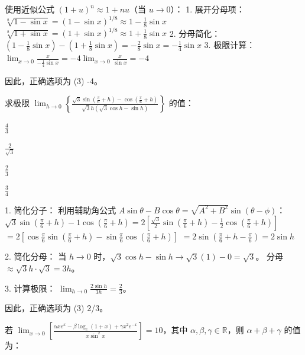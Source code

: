 \begin{questions}
\begin{solution}
使用近似公式 $(1+u)^n \approx 1+nu$（当 $u \to 0$）：
1. 展开分母项：
   $\sqrt[8]{1-\sin x} = (1-\sin x)^{1/8} \approx 1 - \frac{1}{8}\sin x$
   $\sqrt[8]{1+\sin x} = (1+\sin x)^{1/8} \approx 1 + \frac{1}{8}\sin x$
2. 分母简化：
   $(1 - \frac{1}{8}\sin x) - (1 + \frac{1}{8}\sin x) = -\frac{2}{8}\sin x = -\frac{1}{4}\sin x$
3. 极限计算：
   $\lim_{x \to 0} \frac{x}{-\frac{1}{4}\sin x} = -4 \lim_{x \to 0} \frac{x}{\sin x} = -4$

因此，正确选项为 (3) -4。
\end{solution}

\question 
求极限 $\lim_{h \to 0} \left\{ \frac{\sqrt{3}\sin(\frac{\pi}{6}+h) - \cos(\frac{\pi}{6}+h)}{\sqrt{3}h(\sqrt{3}\cos h - \sin h)} \right\}$ 的值：
\begin{choices}
    \item $\frac{4}{3}$
    \item $\frac{2}{\sqrt{3}}$
    \item $\frac{2}{3}$
    \item $\frac{3}{4}$
\end{choices}

\begin{solution}
1. 简化分子：
利用辅助角公式 $A\sin\theta - B\cos\theta = \sqrt{A^2+B^2}\sin(\theta-\phi)$：
$\sqrt{3}\sin(\frac{\pi}{6}+h) - 1\cos(\frac{\pi}{6}+h) = 2 \left[ \frac{\sqrt{3}}{2}\sin(\frac{\pi}{6}+h) - \frac{1}{2}\cos(\frac{\pi}{6}+h) \right]$
$= 2 \left[ \cos\frac{\pi}{6}\sin(\frac{\pi}{6}+h) - \sin\frac{\pi}{6}\cos(\frac{\pi}{6}+h) \right]$
$= 2\sin(\frac{\pi}{6}+h - \frac{\pi}{6}) = 2\sin h$

2. 简化分母：
当 $h \to 0$ 时，$\sqrt{3}\cos h - \sin h \to \sqrt{3}(1) - 0 = \sqrt{3}$。
分母 $\approx \sqrt{3}h \cdot \sqrt{3} = 3h$。

3. 计算极限：
$\lim_{h \to 0} \frac{2\sin h}{3h} = \frac{2}{3}$。

因此，正确选项为 (3) 2/3。
\end{solution}

\question 
若 $\lim_{x \to 0} \left[ \frac{\alpha x e^x - \beta \log_e(1+x) + \gamma x^2 e^{-x}}{x \sin^2 x} \right] = 10$，其中 $\alpha, \beta, \gamma \in \mathbb{R}$，则 $\alpha + \beta + \gamma$ 的值为：


\end{questions}
